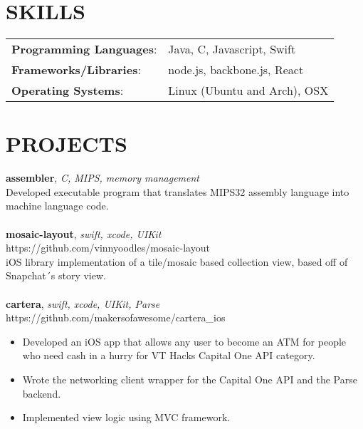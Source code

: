 \documentclass[line,margin]{res}
\begin{document}
\begin{resume}
	\section{SKILLS}
	\begin{tabular}{@{}ll}
		\textbf{Programming Languages}: & Java, C, Javascript, Swift   \\
		\textbf{Frameworks/Libraries}:  & node.js, backbone.js, React  \\
		\textbf{Operating Systems}:     & Linux (Ubuntu and Arch), OSX \\
	\end{tabular}
	\section{PROJECTS}
	\textbf{assembler}, {\sl C, MIPS, memory management}\\ Developed executable program that translates MIPS32 assembly language into machine language code.\\\\
	\textbf{mosaic-layout}, {\sl swift, xcode, UIKit}\\ 
  https://github.com/vinnyoodles/mosaic-layout\\
  iOS library implementation of a tile/mosaic based collection view, based off of Snapchat´s story view.\\ 
  \\
	\textbf{cartera}, {\sl swift, xcode, UIKit, Parse}\\ https://github.com/makersofawesome/cartera\_ios\\\begin{itemize} \itemsep 1pt
	\item Developed an iOS app that allows any user to become an ATM for people who need cash in a hurry for VT Hacks Capital One API category. 
	\item Wrote the networking client wrapper for the Capital One API and the Parse backend. 
	\item Implemented view logic using MVC framework.
	\end{itemize}
	          
	\ 
\end{resume}
\end{document}
